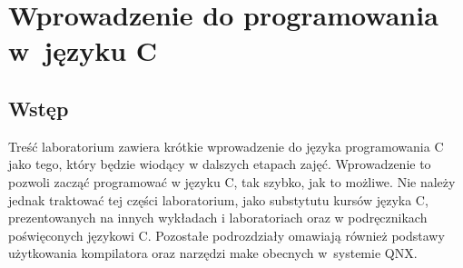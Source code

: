\section{Wprowadzenie do programowania w~języku C}

\subsection{Wstęp}
Treść laboratorium zawiera krótkie wprowadzenie do języka programowania C jako tego, który będzie wiodący w dalszych etapach zajęć. Wprowadzenie to pozwoli zacząć programować w języku C, tak szybko, jak to możliwe. Nie należy jednak traktować tej części laboratorium, jako substytutu kursów języka C, prezentowanych na innych wykładach i laboratoriach oraz w podręcznikach poświęconych językowi C. Pozostałe podrozdziały omawiają również podstawy użytkowania kompilatora oraz narzędzi make obecnych w~systemie QNX.
